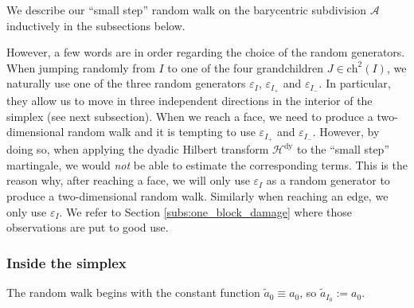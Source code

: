 \documentclass{amsart}
\newcommand{\cA}{\mathcal{A}}
\newcommand{\wt}{\widetilde}
\theoremstyle{definition}
\theoremstyle{remark}
\begin{document}
We describe our ``small step'' random walk on the barycentric subdivision $\cA$ inductively in the subsections below.

However, a few words are in order regarding the choice of the random generators. When jumping randomly from $I$ to one of the four grandchildren $J\in\mathrm{ch}^2(I)$, we naturally use one of the three random generators $\varepsilon_I$, $\varepsilon_{I_+}$ and $\varepsilon_{I_-}$. In particular, they allow us to move in three independent directions in the interior of the simplex (see next subsection). When we reach a face, we need to produce a two-dimensional random walk and it is tempting to use $\varepsilon_{I_+}$ and $\varepsilon_{I_-}$. However, by doing so, when applying the dyadic Hilbert transform $\mathcal{H}^{\mathrm{dy}}$ to the ``small step'' martingale, we would \emph{not} be able to estimate the corresponding terms. This is the reason why, after reaching a face, we will only use $\varepsilon_I$ as a random generator to produce a two-dimensional random walk. Similarly when reaching an edge, we only use $\varepsilon_I$. We refer to Section \ref{subs:one_block_damage} where those observations are put to good use.

\subsubsection{Inside the simplex}

The random walk begins with the constant function $\wt{a}_0\equiv a_0$, so $\wt{a}_{I_0}:=a_0$.
\end{document}
